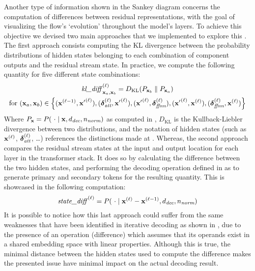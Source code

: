 Another type of information shown in the Sankey diagram concerns the computation of differences between residual representations, with the goal of visualizing the flow's `evolution' throughout the model's layers.
To achieve this objective we devised two main approaches that we implemented to explore this .
The first approach consists  computing the KL divergence between the probability distributions of hidden states belonging to each combination of component outputs and the residual stream state.
In practice, we compute the following quantity for five different state combinations:
\begin{equation}
    \label{eq:method_intravisto_kl-diff}
    \begin{gathered}
        {\textit{kl\_diff}{\,}\strut}_{\bm{\mathbf{x}}_a, \bm{\mathbf{x}}_b}^{(\ell)} = D_{\text{KL}}(P_{\bm{\mathbf{x}}_b} \parallel P_{\bm{\mathbf{x}}_a}) \\
        \text{for} \ (\bm{\mathbf{x}}_a, \bm{\mathbf{x}}_b) \in \Bigl\{
            (\bm{\mathbf{x}}^{(\ell-1)}, {\bm{\mathbf{x}}'}^{(\ell)}), 
            (\bm{\mathbf{\delta}}_\textit{att}^{(\ell)}, {\bm{\mathbf{x}}'}^{(\ell)}), 
            ({\bm{\mathbf{x}}'}^{(\ell)}, \bm{\mathbf{\delta}}_\textit{ffnn}^{(\ell)}), 
            ({\bm{\mathbf{x}}'}^{(\ell)}, \bm{\mathbf{x}}^{(\ell)}), 
            (\bm{\mathbf{\delta}}_\textit{ffnn}^{(\ell)}, \bm{\mathbf{x}}^{(\ell)})
        \Bigr\}
    \end{gathered}
\end{equation}
Where $P_{\bm{\mathbf{x}}} = P(\ \cdot \mid \bm{\mathbf{x}}, d_\textit{dec}, n_\textit{norm})$ as computed in , $D_{\text{KL}}$ is the Kullback-Liebler divergence between two distributions, and the notation of hidden states (such as $\bm{\mathbf{x}}^{(\ell)}$, $\bm{\mathbf{\delta}}_\textit{att}^{(\ell)}$, \ldots) references the distinctions made at .
Whereas, the second approach compares the residual stream states at the input and output location for each layer in the transformer stack.
It does so by calculating the difference between the two hidden states, and performing the decoding operation defined in  as to generate primary and secondary tokens for the resulting quantity.
This is showcased in the following computation:
\begin{equation}
    \label{eq:method_intravisto_state-diff}
    {\textit{state\_diff}{\,}\strut}^{(\ell)} = P(\ \cdot \mid \bm{\mathbf{x}}^{(\ell)} - \bm{\mathbf{x}}^{(\ell - 1)}, d_\textit{dec}, n_\textit{norm})
\end{equation}
It is possible to notice how this last approach could suffer from the same weaknesses that have been identified in iterative decoding as shown in , due to the presence of an operation (difference) which assumes that its operands exist in a shared embedding space with linear properties.
Although this is true, the minimal distance between the hidden states used to compute the difference makes the presented issue have minimal impact on the actual decoding result.

